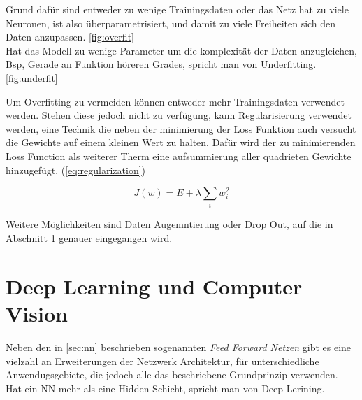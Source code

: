 Grund dafür sind entweder zu wenige Trainingsdaten oder das Netz hat zu viele Neuronen, ist also 
überparametrisiert, und damit zu viele Freiheiten sich den Daten anzupassen. \ref{fig:overfit} 
\\
Hat das Modell zu wenige Parameter um die komplexität der Daten anzugleichen, Bsp, Gerade an Funktion 
höreren Grades, spricht man von Underfitting. \ref{fig:underfit}





Um Overfitting zu vermeiden können entweder mehr Trainingsdaten verwendet werden. Stehen diese 
jedoch nicht zu verfügung, kann Regularisierung verwendet werden, eine Technik die neben der 
minimierung der Loss Funktion auch versucht die Gewichte auf einem kleinen Wert zu halten. 
Dafür wird der zu minimierenden Loss Function als weiterer 
Therm eine aufsummierung aller quadrieten Gewichte hinzugefügt. (\ref{eq:regularization}) 
\cite{geronHandsonMachineLearning2017}


\begin{equation}
    \label{eq:regularization}
    J(w) = E + \lambda \sum_{i} w_{i}^{2}
\end{equation}

Weitere Möglichkeiten sind Daten Augemntierung oder Drop Out, auf die 
in Abschnitt \ref{sec:deepl_cv} genauer eingegangen wird.



\section{Deep Learning und Computer Vision}\label{sec:deepl_cv}



Neben den in \ref{sec:nn} beschrieben sogenannten \textit{Feed Forward Netzen} 
gibt es eine vielzahl an Erweiterungen der Netzwerk Architektur, für unterschiedliche 
Anwendugsgebiete, die jedoch alle das beschriebene Grundprinzip verwenden.\\

Hat ein NN mehr als eine Hidden Schicht, spricht man von Deep Lerining.


